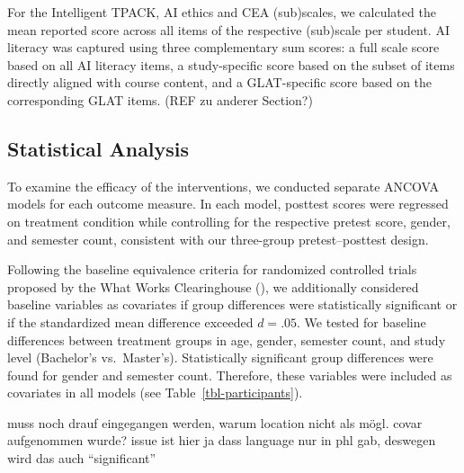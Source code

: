 \documentclass[
  letterpaper,
  DIV=11,
  numbers=noendperiod]{scrartcl}
\begin{document}
For the Intelligent TPACK, AI ethics and CEA (sub)scales, we calculated
the mean reported score across all items of the respective (sub)scale
per student. AI literacy was captured using three complementary sum
scores: a full scale score based on all AI literacy items, a
study-specific score based on the subset of items directly aligned with
course content, and a GLAT-specific score based on the corresponding
GLAT items. (REF zu anderer Section?)

\subsection{Statistical Analysis}\label{statistical-analysis}

To examine the efficacy of the interventions, we conducted separate
ANCOVA models for each outcome measure. In each model, posttest scores
were regressed on treatment condition while controlling for the
respective pretest score, gender, and semester count, consistent with
our three-group pretest--posttest design.

Following the baseline equivalence criteria for randomized controlled
trials proposed by the What Works Clearinghouse
(), we additionally
considered baseline variables as covariates if group differences were
statistically significant or if the standardized mean difference
exceeded \(d = .05\). We tested for baseline differences between
treatment groups in age, gender, semester count, and study level
(Bachelor's vs.~Master's). Statistically significant group differences
were found for gender and semester count. Therefore, these variables
were included as covariates in all models (see
Table~\ref{tbl-participants}).

\begin{tcolorbox}[enhanced jigsaw, breakable, colback=white, opacitybacktitle=0.6, colbacktitle=quarto-callout-note-color!10!white, leftrule=.75mm, colframe=quarto-callout-note-color-frame, toprule=.15mm, opacityback=0, coltitle=black, bottomrule=.15mm, bottomtitle=1mm, toptitle=1mm, titlerule=0mm, title=\textcolor{quarto-callout-note-color}{\faInfo}\hspace{0.5em}{Note}, arc=.35mm, rightrule=.15mm, left=2mm]

muss noch drauf eingegangen werden, warum location nicht als mögl. covar
aufgenommen wurde? issue ist hier ja dass language nur in phl gab,
deswegen wird das auch ``significant''

\end{tcolorbox}
\end{document}
